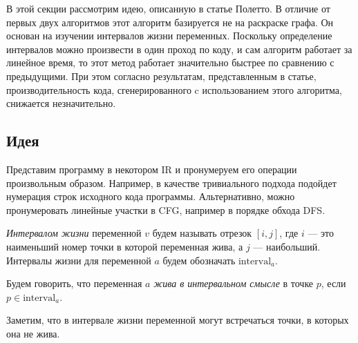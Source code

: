 В этой секции рассмотрим идею, описанную в статье Полетто. В отличие от первых двух алгоритмов
этот алгоритм базируется не на раскраске графа. Он основан на изучении интервалов жизни
переменных. Поскольку определение интервалов можно произвести в один проход по коду, и сам алгоритм
работает за линейное время, то этот метод работает значительно быстрее по сравнению с предыдущими.
При этом согласно результатам, представленным в статье, производительность кода, сгенерированного c использованием этого алгоритма,
снижается незначительно.

\subsection{Идея}

Представим программу в некотором IR и пронумеруем его операции произвольным образом.
Например, в качестве тривиального подхода подойдет нумерация строк исходного кода программы.
Альтернативно, можно пронумеровать линейные участки в CFG, например в порядке обхода DFS.


\begin{definition}
    \textit{Интервалом жизни} переменной $v$ будем называть отрезок $[i, j]$,
    где $i$ --- это наименьший номер точки в которой переменная жива,
    а $j$ --- наибольший.
    Интервалы жизни для переменной $a$ будем обозначать $\text{interval}_a$.
\end{definition}

\begin{definition}
    Будем говорить, что переменная $a$ \textit{жива в интервальном смысле} в точке $p$, если $p \in \text{interval}_a$. 
\end{definition}

Заметим, что в интервале жизни переменной могут встречаться точки, в которых она не жива. 

